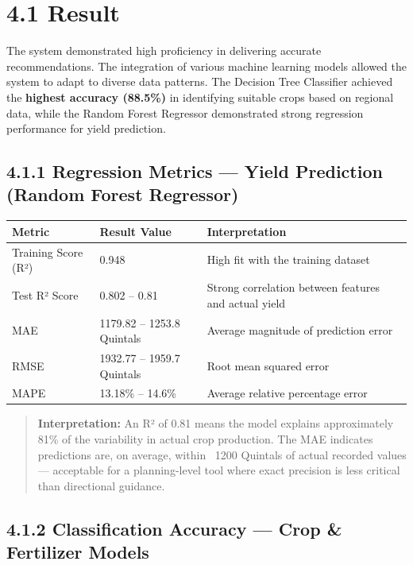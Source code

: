 \documentclass[12pt,a4paper]{report}
\begin{document}
\section{4.1 Result}

The system demonstrated high proficiency in delivering accurate recommendations. The integration of various machine learning models allowed the system to adapt to diverse data patterns. The Decision Tree Classifier achieved the \textbf{highest accuracy (88.5\%)} in identifying suitable crops based on regional data, while the Random Forest Regressor demonstrated strong regression performance for yield prediction.

\subsection{4.1.1 Regression Metrics — Yield Prediction (Random Forest Regressor)}

\begin{table}[h!]
\centering
\begin{tabular}{|l|l|l|}
\hline
Metric & Result Value & Interpretation \\ \hline
Training Score (R²) & 0.948 & High fit with the training dataset \\ \hline
Test R² Score & 0.802 – 0.81 & Strong correlation between features and actual yield \\ \hline
MAE & 1179.82 – 1253.8 Quintals & Average magnitude of prediction error \\ \hline
RMSE & 1932.77 – 1959.7 Quintals & Root mean squared error \\ \hline
MAPE & 13.18\% – 14.6\% & Average relative percentage error \\ \hline
\end{tabular}
\end{table}

\begin{quote}
\textbf{Interpretation:} An R² of 0.81 means the model explains approximately 81\% of the variability in actual crop production. The MAE indicates predictions are, on average, within ~1200 Quintals of actual recorded values — acceptable for a planning-level tool where exact precision is less critical than directional guidance.
\end{quote}

\subsection{4.1.2 Classification Accuracy — Crop \& Fertilizer Models}
\end{document}
